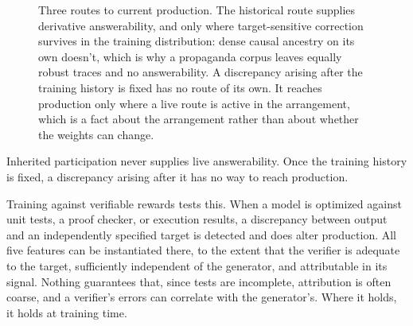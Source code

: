 \documentclass[12pt]{article}
\begin{document}
\begin{figure}[tbp]
\centering
{}
\caption{Three routes to current production. The historical route supplies derivative
answerability, and only where target-sensitive correction survives in the training
distribution: dense causal ancestry on its own doesn't, which is why a propaganda corpus
leaves equally robust traces and no answerability. A discrepancy arising after the training
history is fixed has no route of its own. It reaches production only where a live route is
active in the arrangement, which is a fact about the arrangement rather than about whether
the weights can change.}\label{fig:routes}
\end{figure}

Inherited participation never supplies live answerability. Once the training history is
fixed, a discrepancy arising after it has no way to reach production.

Training against verifiable rewards tests this. When a model is optimized against unit
tests, a proof checker, or execution results, a discrepancy between output and an
independently specified target is detected and does alter production. All five features can
be instantiated there, to the extent that the verifier is adequate to the target,
sufficiently independent of the generator, and attributable in its signal. Nothing guarantees that, since tests are incomplete, attribution is often coarse, and a verifier's errors can
correlate with the generator's. Where it holds, it holds at training time.
\end{document}
